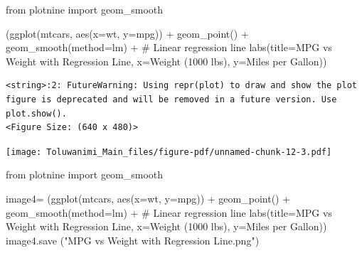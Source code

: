 \documentclass[
  letterpaper,
  DIV=11,
  numbers=noendperiod]{scrreprt}
\newenvironment{Shaded}{\begin{snugshade}}{\end{snugshade}}
\newcommand{\CommentTok}[1]{\textcolor[rgb]{0.37,0.37,0.37}{#1}}
\newcommand{\ImportTok}[1]{\textcolor[rgb]{0.00,0.46,0.62}{#1}}
\newcommand{\NormalTok}[1]{\textcolor[rgb]{0.00,0.23,0.31}{#1}}
\newcommand{\OperatorTok}[1]{\textcolor[rgb]{0.37,0.37,0.37}{#1}}
\newcommand{\StringTok}[1]{\textcolor[rgb]{0.13,0.47,0.30}{#1}}
\begin{document}
\begin{Shaded}
\begin{Highlighting}[]
\ImportTok{from}\NormalTok{ plotnine }\ImportTok{import}\NormalTok{ geom\_smooth}

\NormalTok{(ggplot(mtcars, aes(x}\OperatorTok{=}\StringTok{\textquotesingle{}wt\textquotesingle{}}\NormalTok{, y}\OperatorTok{=}\StringTok{\textquotesingle{}mpg\textquotesingle{}}\NormalTok{)) }\OperatorTok{+}
\NormalTok{ geom\_point() }\OperatorTok{+}
\NormalTok{ geom\_smooth(method}\OperatorTok{=}\StringTok{\textquotesingle{}lm\textquotesingle{}}\NormalTok{) }\OperatorTok{+}  \CommentTok{\# Linear regression line}
\NormalTok{ labs(title}\OperatorTok{=}\StringTok{\textquotesingle{}MPG vs Weight with Regression Line\textquotesingle{}}\NormalTok{,}
\NormalTok{      x}\OperatorTok{=}\StringTok{\textquotesingle{}Weight (1000 lbs)\textquotesingle{}}\NormalTok{,}
\NormalTok{      y}\OperatorTok{=}\StringTok{\textquotesingle{}Miles per Gallon\textquotesingle{}}\NormalTok{))}
\end{Highlighting}
\end{Shaded}

\begin{verbatim}
<string>:2: FutureWarning: Using repr(plot) to draw and show the plot figure is deprecated and will be removed in a future version. Use plot.show().
<Figure Size: (640 x 480)>
\end{verbatim}

\texttt{[image: Toluwanimi\_Main\_files/figure-pdf/unnamed-chunk-12-3.pdf]}

\begin{Shaded}
\begin{Highlighting}[]
\ImportTok{from}\NormalTok{ plotnine }\ImportTok{import}\NormalTok{ geom\_smooth}

\NormalTok{image4}\OperatorTok{=}\NormalTok{ (ggplot(mtcars, aes(x}\OperatorTok{=}\StringTok{\textquotesingle{}wt\textquotesingle{}}\NormalTok{, y}\OperatorTok{=}\StringTok{\textquotesingle{}mpg\textquotesingle{}}\NormalTok{)) }\OperatorTok{+}
\NormalTok{ geom\_point() }\OperatorTok{+}
\NormalTok{ geom\_smooth(method}\OperatorTok{=}\StringTok{\textquotesingle{}lm\textquotesingle{}}\NormalTok{) }\OperatorTok{+}  \CommentTok{\# Linear regression line}
\NormalTok{ labs(title}\OperatorTok{=}\StringTok{\textquotesingle{}MPG vs Weight with Regression Line\textquotesingle{}}\NormalTok{,}
\NormalTok{      x}\OperatorTok{=}\StringTok{\textquotesingle{}Weight (1000 lbs)\textquotesingle{}}\NormalTok{,}
\NormalTok{      y}\OperatorTok{=}\StringTok{\textquotesingle{}Miles per Gallon\textquotesingle{}}\NormalTok{))}
\NormalTok{image4.save (}\StringTok{"MPG vs Weight with Regression Line.png"}\NormalTok{)}
\end{Highlighting}
\end{Shaded}
\end{document}
